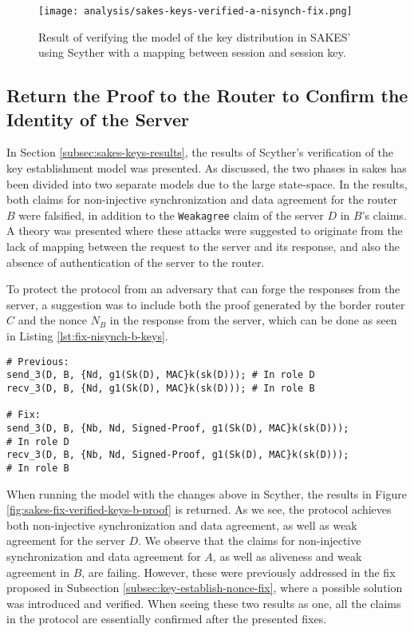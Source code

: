 \begin{figure}[H]
	\centering
	\texttt{[image: analysis/sakes-keys-verified-a-nisynch-fix.png]}
	\caption{Result of verifying the model of the key distribution in SAKES' using Scyther with a mapping between session and session key.}
	\label{fig:sakes-fix-verified-keys-a-nisynch}
\end{figure}



\subsection{Return the Proof to the Router to Confirm the Identity of the Server}

In Section \ref{subsec:sakes-keys-results}, the results of Scyther's verification of the key establishment model was presented. As discussed, the two phases in \gls{sakes} has been divided into two separate models due to the large state-space. In the results, both claims for non-injective synchronization and data agreement for the router $B$ were falsified, in addition to the \texttt{Weakagree} claim of the server $D$ in $B$'s claims. A theory was presented where these attacks were suggested to originate from the lack of mapping between the request to the server and its response, and also the absence of authentication of the server to the router.

To protect the protocol from an adversary that can forge the responses from the server, a suggestion was to include both the proof generated by the border router $C$ and the nonce $N_B$ in the response from the server, which can be done as seen in Listing \ref{lst:fix-nisynch-b-keys}.

\begin{lstlisting}[caption={[Fix to the SAKES protocol to provide authentication of the remote server to the router in the key establishment phase.]Fix to the SAKES protocol to provide authentication of the remote server D to the router B in the key establishment phase.}, label={lst:fix-nisynch-b-keys}, style=code-improvements-sakes-3]
# Previous:
send_3(D, B, {Nd, g1(Sk(D), MAC}k(sk(D))); # In role D
recv_3(D, B, {Nd, g1(Sk(D), MAC}k(sk(D))); # In role B

# Fix:
send_3(D, B, {Nb, Nd, Signed-Proof, g1(Sk(D), MAC}k(sk(D)));
# In role D
recv_3(D, B, {Nb, Nd, Signed-Proof, g1(Sk(D), MAC}k(sk(D)));
# In role B
\end{lstlisting}

When running the model with the changes above in Scyther, the results in Figure \ref{fig:sakes-fix-verified-keys-b-proof} is returned. As we see, the protocol achieves both non-injective synchronization and data agreement, as well as weak agreement for the server $D$. We observe that the claims for non-injective synchronization and data agreement for $A$, as well as aliveness and weak agreement in $B$, are failing. However, these were previously addressed in the fix proposed in Subsection \ref{subsec:key-establish-nonce-fix}, where a possible solution was introduced and verified. When seeing these two results as one, all the claims in the protocol are essentially confirmed after the presented fixes.


